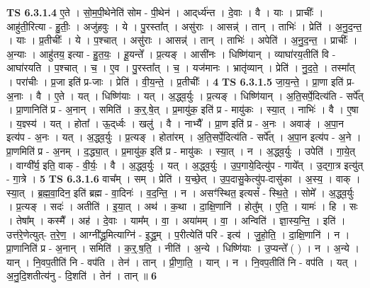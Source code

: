 \documentclass[17pt]{extarticle}
\begin{document}
                  \newline
                                \textbf{ TS 6.3.1.4} \newline
                  ए॒ते । सो॒म॒पी॒थेनेति॑ सोम - पी॒थेन॑ । आद्‌र्ध्य॑न्त । दे॒वाः । वै । याः । प्राचीः᳚ । आहु॑ती॒रित्या - हु॒तीः॒ । अजु॑हवुः । ये । पु॒रस्ता᳚त् । असु॑राः । आसन्न्॑ । तान् । ताभिः॑ । प्रेति॑ । अ॒नु॒द॒न्त॒ । याः । प्र॒तीचीः᳚ । ये । प॒श्चात् । असु॑राः । आसन्न्॑ । तान् । ताभिः॑ । अपेति॑ । अ॒नु॒द॒न्त॒ । प्राचीः᳚ । अ॒न्याः । आहु॑तय॒ इत्या - हु॒त॒यः॒ । हू॒यन्ते᳚ । प्र॒त्यङ् । आसी॑नः । धिष्णि॑यान् । व्याघा॑रय॒तीति॑ वि - आघा॑रयति । प॒श्चात् । च॒ । ए॒व । पु॒रस्ता᳚त् । च॒ । यज॑मानः । भ्रातृ॑व्यान् । प्रेति॑ । नु॒द॒ते॒ । तस्मा᳚त् । परा॑चीः । प्र॒जा इति॑ प्र-जाः । प्रेति॑ । वी॒य॒न्ते॒ । प्र॒तीचीः᳚ । \textbf{  4} \newline
                  \newline
                                \textbf{ TS 6.3.1.5} \newline
                  जा॒य॒न्ते॒ । प्रा॒णा इति॑ प्र-अ॒नाः । वै । ए॒ते । यत् । धिष्णि॑याः । यत् । अ॒द्ध्व॒र्युः । प्र॒त्यङ् । धिष्णि॑यान् । अ॒ति॒सर्पे॒दित्य॑ति - सर्पे᳚त् । प्रा॒णानिति॑ प्र - अ॒नान् । समिति॑ । क॒र्॒.षे॒त् । प्र॒मायु॑क॒ इति॑ प्र - मायु॑कः । स्या॒त् । नाभिः॑ । वै । ए॒षा । य॒ज्ञ्स्य॑ । यत् । होता᳚ । ऊ॒द्‌र्ध्वः । खलु॑ । वै । नाभ्यै᳚ । प्रा॒ण इति॑ प्र - अ॒नः । अवाङ्॑ । अ॒पा॒न इत्य॑प - अ॒नः । यत् । अ॒द्ध्व॒र्युः । प्र॒त्यङ् । होता॑रम् । अ॒ति॒सर्पे॒दित्य॑ति - सर्पे᳚त् । अ॒पा॒न इत्य॑प - अ॒ने । प्रा॒णमिति॑ प्र - अ॒नम् । द॒द्ध्या॒त् । प्र॒मायु॑क॒ इति॑ प्र - मायु॑कः । स्या॒त् । न । अ॒द्ध्व॒र्युः । उपेति॑ । गा॒ये॒त् । वाग्वी᳚र्य॒ इति॒ वाक् - वी॒र्यः॒ । वै । अ॒द्ध्व॒र्युः । यत् । अ॒द्ध्व॒र्युः । उ॒प॒गाये॒दित्यु॑प - गाये᳚त् । उ॒द्गा॒त्र इत्यु॑त् - गा॒त्रे । \textbf{  5} \newline
                  \newline
                                \textbf{ TS 6.3.1.6} \newline
                  वाच᳚म् । सम् । प्रेति॑ । य॒च्छे॒त् । उ॒प॒दासु॒केत्यु॑प-दासु॑का । अ॒स्य॒ । वाक् । स्या॒त् । ब्र॒ह्म॒वा॒दिन॒ इति॑ ब्रह्म - वा॒दिनः॑ । व॒द॒न्ति॒ । न । असꣳ॑स्थित॒ इत्यसं᳚ - स्थि॒ते॒ । सोमे᳚ । अ॒द्ध्व॒र्युः । प्र॒त्यङ् । सदः॑ । अतीति॑ । इ॒या॒त् । अथ॑ । क॒था । दा॒क्षि॒णानि॑ । होतु᳚म् । ए॒ति॒ । यामः॑ । हि । सः । तेषा᳚म् । कस्मै᳚ । अह॑ । दे॒वाः । याम᳚म् । वा॒ । अया॑मम् । वा॒ । अन्विति॑ । ज्ञा॒स्य॒न्ति॒ । इति॑ । उत्त॑रे॒णेत्युत्- त॒रे॒ण॒ । आग्नी᳚द्ध्र॒मित्याग्नि॑ - इ॒द्ध्र॒म् । प॒रीत्येति॑ परि - इत्य॑ । जु॒हो॒ति॒ । दा॒क्षि॒णानि॑ । न । प्रा॒णानिति॑ प्र - अ॒नान् । समिति॑ । क॒र्॒.ष॒ति॒ । नीति॑ । अ॒न्ये । धिष्णि॑याः । उ॒प्यन्ते᳚ ( ) । न । अ॒न्ये । यान् । नि॒वप॒तीति॑ नि - वप॑ति । तेन॑ । तान् । प्री॒णा॒ति॒ । यान् । न । नि॒वप॒तीति॑ नि - वप॑ति । यत् । अ॒नु॒दि॒शतीत्य॑नु - दि॒शति॑ । तेन॑ । तान् ॥ \textbf{  6 } \newline
\end{document}
